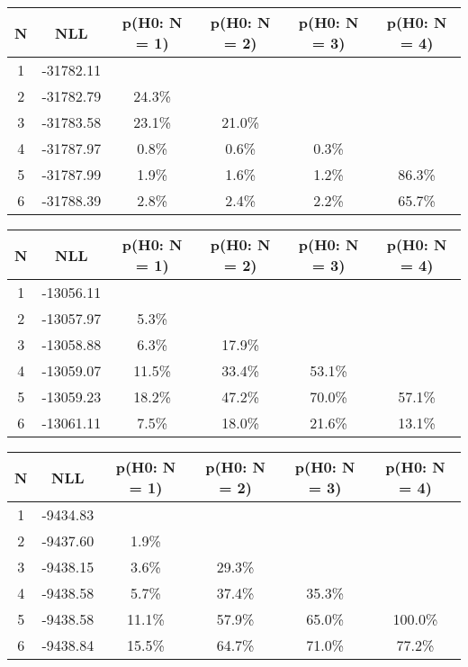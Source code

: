 \begin{table}[htb]
	\begin{center}
{\footnotesize\renewcommand{\arraystretch}{1.4}
		\begin{tabular}{cc||cccc}
			N & NLL & p(H0: N = 1) & p(H0: N = 2) & p(H0: N = 3) & p(H0: N = 4)\\ 
		\hline
1 & -31782.11 & & & & \\
2 & -31782.79 & 24.3\% & & & \\
3 & -31783.58 & 23.1\% & 21.0\% & & \\
4 & -31787.97 & 0.8\% & 0.6\% & 0.3\% & \\
5 & -31787.99 & 1.9\% & 1.6\% & 1.2\% & 86.3\% \\
6 & -31788.39 & 2.8\% & 2.4\% & 2.2\% & 65.7\% \\
	\end{tabular}
		\label{tab:lab}
	}
	\end{center}\end{table}

\begin{table}[htb]
	\begin{center}
{\footnotesize\renewcommand{\arraystretch}{1.4}
		\begin{tabular}{cc||cccc}
			N & NLL & p(H0: N = 1) & p(H0: N = 2) & p(H0: N = 3) & p(H0: N = 4)\\ 
		\hline
1 & -13056.11 & & & & \\
2 & -13057.97 & 5.3\% & & & \\
3 & -13058.88 & 6.3\% & 17.9\% & & \\
4 & -13059.07 & 11.5\% & 33.4\% & 53.1\% & \\
5 & -13059.23 & 18.2\% & 47.2\% & 70.0\% & 57.1\% \\
6 & -13061.11 & 7.5\% & 18.0\% & 21.6\% & 13.1\% \\
	\end{tabular}
		\label{tab:lab}
	}
	\end{center}\end{table}

\begin{table}[htb]
	\begin{center}
{\footnotesize\renewcommand{\arraystretch}{1.4}
		\begin{tabular}{cc||cccc}
			N & NLL & p(H0: N = 1) & p(H0: N = 2) & p(H0: N = 3) & p(H0: N = 4)\\ 
		\hline
1 & -9434.83 & & & & \\
2 & -9437.60 & 1.9\% & & & \\
3 & -9438.15 & 3.6\% & 29.3\% & & \\
4 & -9438.58 & 5.7\% & 37.4\% & 35.3\% & \\
5 & -9438.58 & 11.1\% & 57.9\% & 65.0\% & 100.0\% \\
6 & -9438.84 & 15.5\% & 64.7\% & 71.0\% & 77.2\% \\
	\end{tabular}
		\label{tab:lab}
	}
	\end{center}\end{table}

